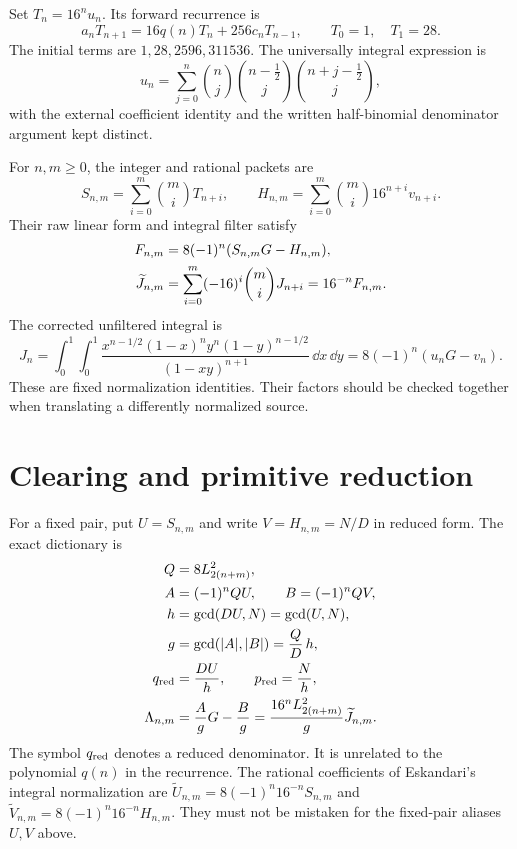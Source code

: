 Set $T_n=16^nu_n$. Its forward recurrence is
\begin{equation}
 a_nT_{n+1}=16q(n)T_n+256c_nT_{n-1},
 \qquad T_0=1,\quad T_1=28.
 \label{eq:app-T-recurrence}
\end{equation}
The initial terms are $1,28,2596,311536$. The universally integral expression is
\begin{equation}
 u_n=\sum_{j=0}^n\binom nj
 \binom{n-\tfrac12}{j}\binom{n+j-\tfrac12}{j},
 \label{eq:app-half-binomial}
\end{equation}
with the external coefficient identity and the written half-binomial denominator argument kept distinct.

For $n,m\geq0$, the integer and rational packets are
\begin{equation}
 S_{n,m}=\sum_{i=0}^m\binom miT_{n+i},\qquad
 H_{n,m}=\sum_{i=0}^m\binom mi16^{n+i}v_{n+i}.
 \label{eq:app-packets}
\end{equation}
Their raw linear form and integral filter satisfy
\begin{align}
 F_{n,m}&=8(-1)^n(S_{n,m}G-H_{n,m}),\notag\\
 \widetilde J_{n,m}
 &=\sum_{i=0}^m(-16)^i\binom miJ_{n+i}
 =16^{-n}F_{n,m}.
 \label{eq:app-filter}
\end{align}
The corrected unfiltered integral is
\begin{equation}
 J_n=\int_0^1\!\int_0^1
 \frac{x^{n-1/2}(1-x)^ny^n(1-y)^{n-1/2}}
 {(1-xy)^{n+1}}\,\dd x\,\dd y
 =8(-1)^n(u_nG-v_n).
 \label{eq:app-J}
\end{equation}
These are fixed normalization identities. Their factors should be checked together when translating a differently normalized source.

\section{Clearing and primitive reduction}

For a fixed pair, put $U=S_{n,m}$ and write $V=H_{n,m}=N/D$ in reduced form. The exact dictionary is
\begin{align}
 Q&=8L_{2(n+m)}^2,\notag\\
 A&=(-1)^nQU,\qquad B=(-1)^nQV,\notag\\
 h&=\gcd(DU,N)=\gcd(U,N),\notag\\
 g&=\gcd(|A|,|B|)=\frac QD\,h,\notag\\
 q_{\rm red}&=\frac{DU}{h},\qquad p_{\rm red}=\frac Nh,\notag\\
 \Lambda_{n,m}&=\frac AgG-\frac Bg
 =\frac{16^nL_{2(n+m)}^2}{g}\widetilde J_{n,m}.
 \label{eq:app-reduction-dictionary}
\end{align}
The symbol $q_{\rm red}$ denotes a reduced denominator. It is unrelated to the polynomial $q(n)$ in the recurrence. The rational coefficients of Eskandari's integral normalization are $\widetilde U_{n,m}=8(-1)^n16^{-n}S_{n,m}$ and $\widetilde V_{n,m}=8(-1)^n16^{-n}H_{n,m}$. They must not be mistaken for the fixed-pair aliases $U,V$ above.

